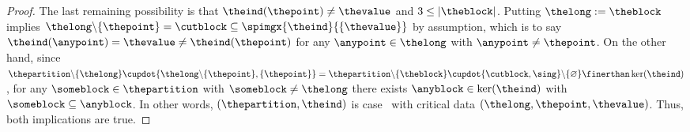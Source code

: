 \documentclass[pdftex]{sigma}
\numberwithin{equation}{section}
\begin{document}
{\begin{proof}
  The last remaining possibility is that  $\theind(\thepoint)\neq \thevalue$ and $3\leq |\theblock|$. Putting $\thelong:=\theblock$ implies $\thelong\backslash \{\thepoint\}=\cutblock\subseteq \spimgx{\theind}{\{\thevalue\}}$ by assumption, which is to say $\theind(\anypoint)= \thevalue\neq \theind(\thepoint)$ for any $\anypoint\in\thelong$ with $\anypoint\neq \thepoint$. On the other hand, since $\thepartition\backslash\{\thelong\}\cupdot \{\thelong\backslash \{\thepoint\},\{\thepoint\}\} =\thepartition\backslash \{\theblock\}\cupdot \{\cutblock,\sing\}\backslash \{\varnothing\}\finerthan \ker(\theind)$, for any  $\someblock\in\thepartition$ with $\someblock\neq\thelong$ there exists $\anyblock\in \ker(\theind)$ with $\someblock\subseteq \anyblock$. In other words, $(\thepartition,\theind)$ is case~\scenariothree{} with critical data $(\thelong,\thepoint,\thevalue)$. Thus, both implications are true.
\end{proof}
}
\end{document}
